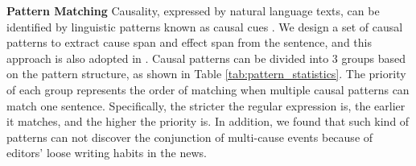 \textbf{Pattern Matching}
Causality, expressed by natural language texts, can be identified by linguistic patterns known as causal cues \cite{Chang2005}.
We design a set of causal patterns to extract cause span and effect span from the sentence, and this approach is also adopted in \cite{Luo2016a,Zhao2017,Radinsky2012}. 
Causal patterns can be divided into 3 groups based on the pattern structure, as shown in Table \ref{tab:pattern_statistics}. 
The priority of each group represents the order of matching when multiple causal patterns can match one sentence. 
Specifically, the stricter the regular expression is, the earlier it matches, and the higher the priority is. 
In addition, we found that such kind of patterns can not discover the conjunction of multi-cause events because of editors' loose writing habits in the news. 
%
%




